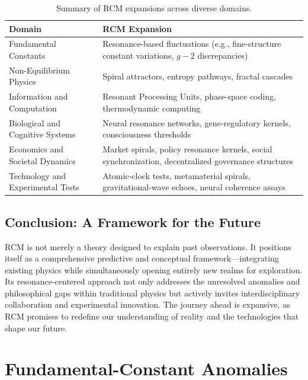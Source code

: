 \begin{table}[h]
  \centering
  \small
  \setlength{\tabcolsep}{6pt}
  \renewcommand{\arraystretch}{1.2}
  \begin{tabular}{p{} p{}}
    \toprule
    \textbf{Domain} & \textbf{RCM Expansion} \\
    \midrule
    Fundamental Constants
      & Resonance-based fluctuations (e.g., fine-structure constant variations, $g-2$ discrepancies) \\
    Non-Equilibrium Physics
      & Spiral attractors, entropy pathways, fractal cascades \\
    Information and Computation
      & Resonant Processing Units, phase-space coding, thermodynamic computing \\
    Biological and Cognitive Systems
      & Neural resonance networks, gene-regulatory kernels, consciousness thresholds \\
    Economics and Societal Dynamics
      & Market spirals, policy resonance kernels, social synchronization, decentralized governance structures \\
    Technology and Experimental Tests
      & Atomic-clock tests, metamaterial spirals, gravitational-wave echoes, neural coherence assays \\
    \bottomrule
  \end{tabular}
  \caption{Summary of RCM expansions across diverse domains.}
\end{table}

\subsection{Conclusion: A Framework for the Future}

RCM is not merely a theory designed to explain past observations. It positions itself as a comprehensive predictive and conceptual framework—integrating existing physics while simultaneously opening entirely new realms for exploration. Its resonance-centered approach not only addresses the unresolved anomalies and philosophical gaps within traditional physics but actively invites interdisciplinary collaboration and experimental innovation. The journey ahead is expansive, as RCM promises to redefine our understanding of reality and the technologies that shape our future.


\section{Fundamental-Constant Anomalies}

